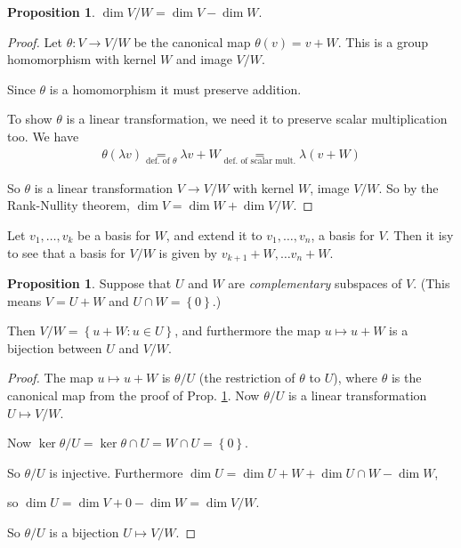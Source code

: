 \documentclass{article}
\theoremstyle{definition} \newtheorem*{definition}{Definition}
\newtheorem{proposition}[theorem]{Proposition}
\begin{document}
\begin{proposition}
  $\dim V/W = \dim V - \dim W$.
  \label{prp:dimvw}
\end{proposition}

\begin{proof}
  Let $\theta:V \rightarrow V/W$ be the canonical map $\theta(v) = v + W$. This is a group
  homomorphism with kernel $W$ and image $V/W$.

  Since $\theta$ is a homomorphism it must preserve addition.

  To show $\theta$ is a linear transformation, we need it to preserve scalar multiplication too. We have 
\begin{align*}
  \theta(\lambda v) \underset{\text{def. of }\theta}{=} \lambda v + W \underset{\text{def. of
  scalar mult.}}{=} \lambda (v + W)
\end{align*}

So $\theta$ is a linear transformation $V \rightarrow V/W$ with kernel $W$, image $V/W$. So by
the Rank-Nullity theorem, $\dim V = \dim W + \dim V/W$.
\end{proof}

\begin{remark}
  Let $v_1, \dots, v_k$ be a basis for $W$, and extend it to $v_1, \dots, v_n$, a basis for $V$.
  Then it isy to see that a basis for $V/W$ is given by $v_{k+1}+W, \dots
  v_n + W$.\\
\end{remark}

\begin{proposition}
  Suppose that $U$ and $W$ are \emph{complementary} subspaces of $V$.
  (This  means $V = U + W$ and $U \cap W = \left\{ 0 \right\}$.)

  Then $V/W = \left\{ u + W : u \in U \right\}$, and furthermore the map
  $u \mapsto u + W$ is a bijection between $U$ and $V/W$.
\end{proposition}

\begin{proof}
  The map $u \mapsto u + W$ is $\theta / U$ (the restriction of $\theta$
  to $U$), where $\theta$ is the canonical map from the proof of Prop.
  \ref{prp:dimvw}. Now $\theta / U$ is a linear transformation 
  $U \mapsto V/W$.

  Now $\ker \theta / U = \ker \theta \cap U = W \cap U = \left\{ 0 \right\}$.

  So $\theta / U$ is injective. Furthermore $\dim U = \dim U + W + 
  \dim U \cap W - \dim W$,

  so $\dim U = \dim V + 0 - \dim W = \dim V / W$. 

  So $\theta / U$ is a bijection $U \mapsto V/W$.
\end{proof}
\end{document}
